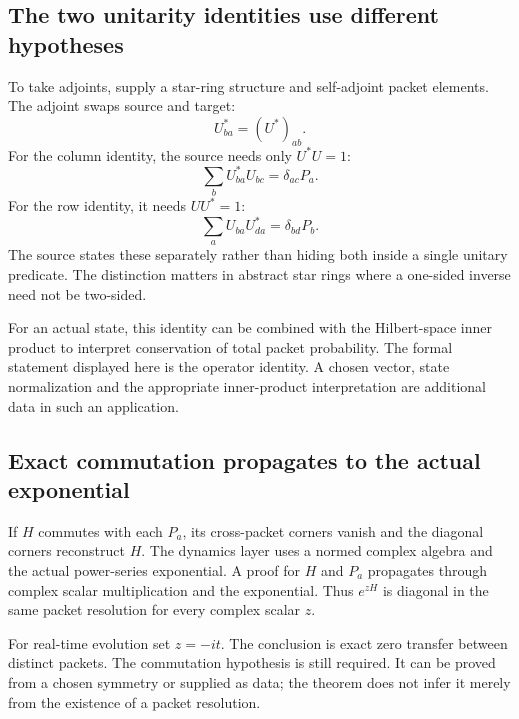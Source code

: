 \subsection{The two unitarity identities use different hypotheses}
To take adjoints, supply a star-ring structure and self-adjoint packet elements. The adjoint swaps source and target:
\[
U_{ba}^*=(U^*)_{ab}.
\]
For the column identity, the source needs only $U^*U=1$:
\[
\sum_bU_{ba}^*U_{bc}=\delta_{ac}P_a.
\]
For the row identity, it needs $UU^*=1$:
\[
\sum_aU_{ba}U_{da}^*=\delta_{bd}P_b.
\]
The source states these separately rather than hiding both inside a single unitary predicate. The distinction matters in abstract star rings where a one-sided inverse need not be two-sided.



For an actual state, this identity can be combined with the Hilbert-space inner product to interpret conservation of total packet probability. The formal statement displayed here is the operator identity. A chosen vector, state normalization and the appropriate inner-product interpretation are additional data in such an application.

\subsection{Exact commutation propagates to the actual exponential}
If $H$ commutes with each $P_a$, its cross-packet corners vanish and the diagonal corners reconstruct $H$. The dynamics layer uses a normed complex algebra and the actual power-series exponential. A  proof for $H$ and $P_a$ propagates through complex scalar multiplication and the exponential. Thus $e^{zH}$ is diagonal in the same packet resolution for every complex scalar $z$.


For real-time evolution set $z=-it$. The conclusion is exact zero transfer between distinct packets. The commutation hypothesis is still required. It can be proved from a chosen symmetry or supplied as data; the theorem does not infer it merely from the existence of a packet resolution.

